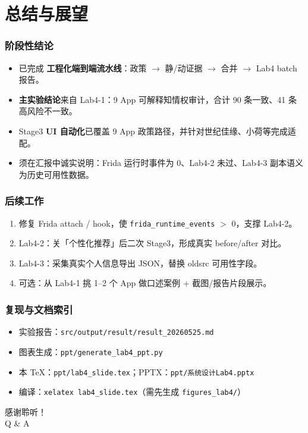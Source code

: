 \documentclass[AutoFakeBold,AutoFakeSlant]{beamer}
\begin{document}
\section{总结与展望}

\begin{frame}
    \frametitle{阶段性结论}
    \small
    \begin{itemize}
        \item 已完成 \textbf{工程化端到端流水线}：政策 $\rightarrow$ 静/动证据 $\rightarrow$ 合并 $\rightarrow$ Lab4 batch 报告。
        \item \textbf{主实验结论}来自 Lab4-1：9 App 可解释知情权审计，合计 90 条一致、41 条高风险不一致。
        \item Stage3 \textbf{UI 自动化}已覆盖 9 App 政策路径，并针对世纪佳缘、小荷等完成适配。
        \item 须在汇报中诚实说明：Frida 运行时事件为 0、Lab4-2 未过、Lab4-3 副本语义为历史可用性数据。
    \end{itemize}
\end{frame}

\begin{frame}
    \frametitle{后续工作}
    \small
    \begin{enumerate}
        \item 修复 Frida attach / hook，使 \texttt{frida\_runtime\_events} $>$ 0，支撑 Lab4-2。
        \item Lab4-2：关「个性化推荐」后二次 Stage3，形成真实 before/after 对比。
        \item Lab4-3：采集真实个人信息导出 JSON，替换 oldsrc 可用性字段。
        \item 可选：从 Lab4-1 挑 1--2 个 App 做口述案例 + 截图/报告片段展示。
    \end{enumerate}
\end{frame}

\begin{frame}
    \frametitle{复现与文档索引}
    \scriptsize
    \begin{itemize}
        \item 实验报告：\texttt{src/output/result/result\_20260525.md}
        \item 图表生成：\texttt{ppt/generate\_lab4\_ppt.py}
        \item 本 TeX：\texttt{ppt/lab4\_slide.tex}；PPTX：\texttt{ppt/系统设计Lab4.pptx}
        \item 编译：\texttt{xelatex lab4\_slide.tex}（需先生成 \texttt{figures\_lab4/}）
    \end{itemize}
\end{frame}

\begin{frame}
    \begin{center}
        {\Huge 感谢聆听！}\\[0.8em]
        {\large Q \& A}
    \end{center}
\end{frame}
\end{document}
